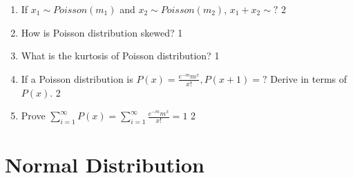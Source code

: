 \documentclass[a4paper,oneside]{book}
\begin{document}
\begin{enumerate}
\item If $x_1 \sim Poisson (m_1)$ and  $x_2 \sim Poisson (m_2)$,  $x_1 + x_2 \sim ?$ \hfill 2

\item How is Poisson distribution skewed? \hfill 1

\item What is the kurtosis of Poisson distribution? \hfill 1

\item If a Poisson distribution is $P(x) = \frac{e^{-m}m^x}{x!}, P(x+1) = ?$ Derive in terms of $P(x)$. \hfill 2

\item Prove $\displaystyle \sum_{i=1}^{\infty} P(x) = \sum_{i=1}^{\infty} \frac{e^{-m} m^x}{x!} = 1$ \hfill 2
\end{enumerate}


\chapter{Normal Distribution} 
\end{document}
